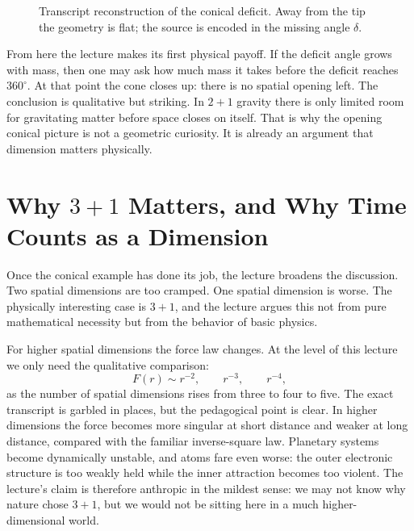 \begin{figure}
\centering
{}
\caption{Transcript reconstruction of the conical deficit. Away from the tip the geometry is flat; the source is encoded in the missing angle \(\delta\).}
\end{figure}

From here the lecture makes its first physical payoff. If the deficit angle grows with mass, then one may ask how much mass it takes before the deficit reaches \(360^\circ\). At that point the cone closes up: there is no spatial opening left. The conclusion is qualitative but striking. In \(2+1\) gravity there is only limited room for gravitating matter before space closes on itself. That is why the opening conical picture is not a geometric curiosity. It is already an argument that dimension matters physically.

\section{Why \(3+1\) Matters, and Why Time Counts as a Dimension}

Once the conical example has done its job, the lecture broadens the discussion. Two spatial dimensions are too cramped. One spatial dimension is worse. The physically interesting case is \(3+1\), and the lecture argues this not from pure mathematical necessity but from the behavior of basic physics.

For higher spatial dimensions the force law changes. At the level of this lecture we only need the qualitative comparison:
\begin{equation}
F(r)\sim r^{-2},\qquad r^{-3},\qquad r^{-4},
\end{equation}
as the number of spatial dimensions rises from three to four to five. The exact transcript is garbled in places, but the pedagogical point is clear. In higher dimensions the force becomes more singular at short distance and weaker at long distance, compared with the familiar inverse-square law. Planetary systems become dynamically unstable, and atoms fare even worse: the outer electronic structure is too weakly held while the inner attraction becomes too violent. The lecture's claim is therefore anthropic in the mildest sense: we may not know why nature chose \(3+1\), but we would not be sitting here in a much higher-dimensional world.

